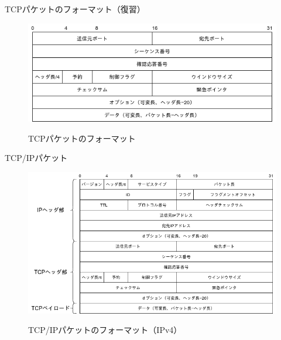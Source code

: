\documentclass[12pt,aspectratio=169]{beamer}
\begin{document}
\begin{frame}{TCPパケットのフォーマット（復習）}

  \centering
  \begin{figure}
    \centering
    \includegraphics[width=12cm,bb=0 0 581 231]{./figures/tcp_packet.png}
    \label{fig:tcp_packet}
    \caption{TCPパケットのフォーマット}
  \end{figure}

\end{frame}


\begin{frame}{TCP/IPパケット}

  \centering
  \begin{figure}
    \centering
    \includegraphics[width=12cm,bb=0 0 721 411]{./figures/tcpip_packet.png}
    \label{fig:tcpip_packet}
    \caption{TCP/IPパケットのフォーマット（IPv4）}
  \end{figure}

\end{frame}
\end{document}
